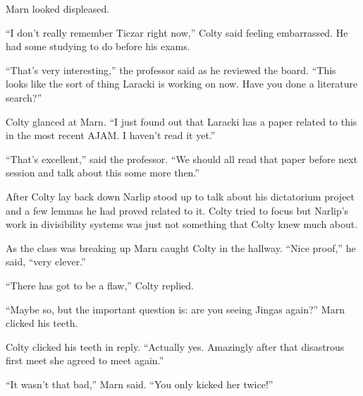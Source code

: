 Marn looked displeased.

``I don't really remember Ticzar right now,'' Colty said feeling embarrassed. He had some
studying to do before his exams.

``That's very interesting,'' the professor said as he reviewed the board. ``This looks like the
sort of thing Laracki is working on now. Have you done a literature search?''

Colty glanced at Marn. ``I just found out that Laracki has a paper related to this in the most
recent AJAM. I haven't read it yet.''

``That's excellent,'' said the professor. ``We should all read that paper before next session
and talk about this some more then.''

After Colty lay back down Narlip stood up to talk about his dictatorium project and a few lemmas
he had proved related to it. Colty tried to focus but Narlip's work in divisibility systems was
just not something that Colty knew much about.

As the class was breaking up Marn caught Colty in the hallway. ``Nice proof,'' he said, ``very
clever.''

``There has got to be a flaw,'' Colty replied.

``Maybe so, but the important question is: are you seeing Jingas again?'' Marn clicked his
teeth.

Colty clicked his teeth in reply. ``Actually yes. Amazingly after that disastrous first meet she
agreed to meet again.''

``It wasn't that bad,'' Marn said. ``You only kicked her twice!''
